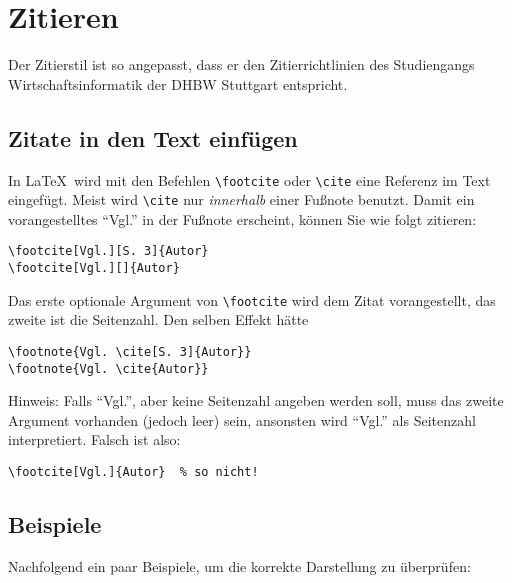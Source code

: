 \chapter{Zitieren}\label{chapter:zitate}

Der Zitierstil ist so angepasst, dass er den Zitierrichtlinien des Studiengangs Wirtschaftsinformatik der DHBW Stuttgart entspricht. 

\section{Zitate in den Text einfügen}
In \LaTeX\ wird mit den Befehlen \verb|\footcite| 
oder 
\verb|\cite|
eine Referenz im Text eingefügt. Meist wird \verb|\cite| nur \emph{innerhalb} einer Fußnote benutzt. 
Damit ein vorangestelltes \enquote{Vgl.} in der Fußnote erscheint, können Sie wie folgt zitieren:
\begin{verbatim}
\footcite[Vgl.][S. 3]{Autor}
\footcite[Vgl.][]{Autor}
\end{verbatim}

Das erste optionale Argument von \verb|\footcite| wird dem Zitat vorangestellt, das zweite ist die Seitenzahl. Den selben Effekt hätte
\begin{verbatim}
\footnote{Vgl. \cite[S. 3]{Autor}}
\footnote{Vgl. \cite{Autor}}
\end{verbatim}

Hinweis: Falls \enquote{Vgl.}, aber keine Seitenzahl angeben werden soll, muss das zweite Argument vorhanden (jedoch leer) sein, ansonsten wird \enquote{Vgl.} als Seitenzahl interpretiert. Falsch ist also: 
\begin{verbatim}
\footcite[Vgl.]{Autor}  % so nicht!
\end{verbatim}



\section{Beispiele}
Nachfolgend ein paar Beispiele, um die korrekte Darstellung zu überprüfen:

